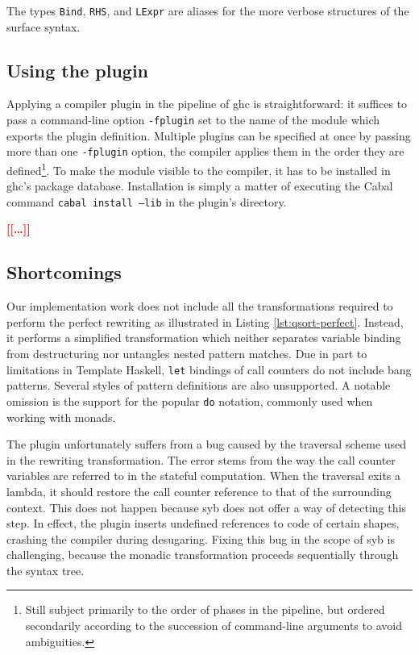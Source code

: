 \documentclass[thesis=B,english]{FITthesis}[2019/12/23]
\newcommand{\todo}[1]{\textcolor{red}{\textbf{[[#1]]}}}
\newcommand{\hsType}[1]{\texttt{#1}}
\newcommand{\hsCode}[1]{\texttt{#1}}
\begin{document}
The types \hsType{Bind}, \hsType{RHS}, and \hsType{LExpr} are aliases for the
more verbose structures of the surface syntax.

\subsection*{Using the plugin}
Applying a compiler plugin in the pipeline of \acrshort{ghc} is
straightforward: it suffices to pass a command-line option \texttt{-fplugin}
set to the name of the module which exports the plugin definition. Multiple
plugins can be specified at once by passing more than one \texttt{-fplugin}
option, the compiler applies them in the order they are defined\footnote{
	Still subject primarily to the order of phases in the pipeline, but ordered
	secondarily according to the succession of command-line arguments to avoid
	ambiguities.
}. To make the module visible to the compiler, it has to be installed in
\acrshort{ghc}'s package database. Installation is simply a matter of executing
the Cabal command \texttt{cabal install --lib} in the plugin's
directory.

\todo{\ldots}

\subsection*{Shortcomings}
Our implementation work does not include all the transformations required to
perform the perfect rewriting as illustrated in Listing
\ref{lst:qsort-perfect}. Instead, it performs a simplified transformation which
neither separates variable binding from destructuring nor untangles nested
pattern matches. Due in part to limitations in Template Haskell, \hsCode{let}
bindings of call counters do not include bang patterns. Several styles of
pattern definitions are also unsupported. A notable omission is the support for
the popular \hsCode{do} notation, commonly used when working with monads.

The plugin unfortunately suffers from a bug caused by the traversal scheme used
in the rewriting transformation. The error stems from the way the call counter
variables are referred to in the stateful computation.  When the traversal
exits a lambda, it should restore the call counter reference to that of the
surrounding context. This does not happen because \acrshort{syb} does not offer
a way of detecting this step. In effect, the plugin inserts undefined
references to code of certain shapes, crashing the compiler during desugaring.
Fixing this bug in the scope of \acrshort{syb} is challenging, because the
monadic transformation proceeds sequentially through the syntax tree.
\end{document}
